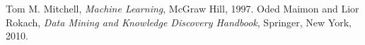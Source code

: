 
\begin{thebibliography}{99}
 Tom M. Mitchell, \textit{Machine Learning}, McGraw Hill, 1997.
 Oded Maimon and Lior Rokach, \textit{Data Mining and Knowledge Discovery Handbook}, Springer, New York, 2010.
\end{thebibliography}
